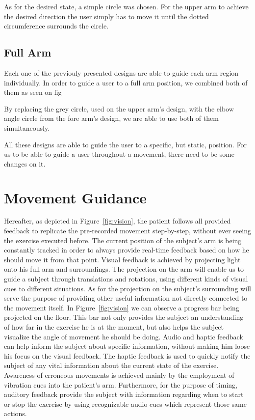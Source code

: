 
As for the desired state, a simple circle was chosen. For the upper arm to achieve the desired direction the user simply has to move it until the dotted circumference surrounds the circle.

\subsection{Full Arm}

Each one of the previouly presented designs are able to guide each arm region individually.
In order to guide a user to a full arm position, we combined both of them as seen on fig 

By replacing the grey circle, used on the upper arm's design, with the elbow angle circle from the fore arm's design, we are able to use both of them simultaneously. 

All these designs are able to guide the user to a specific, but static, position. For us to be able to guide a user throughout a movement, there need to be some changes on it.

\section{Movement Guidance}

Hereafter, as depicted in Figure~\ref{fig:vision}, 
the patient follows all provided feedback to replicate the pre-recorded movement step-by-step, without ever seeing the exercise executed before.
The current position of the subject's arm is being constantly tracked in order to always provide real-time 
feedback based on how he should move it from that point.
Visual feedback is achieved by projecting light onto his full arm and surroundings. The projection on the arm will enable us to 
guide a subject through translations and rotations, using different kinds of visual cues to different situations. As for the projection on the subject's surrounding 
will serve the purpose of providing other useful information not directly connected to the movement itself. 
In Figure~\ref{fig:vision} we can observe a progress bar being projected on the floor. 
This bar not only provides the subject an understanding of how far in the exercise he is at the moment, but also helps the subject visualize the angle of movement he should be doing.
Audio and haptic feedback can help inform the subject about specific information, without making him loose his focus on the visual feedback.
The haptic feedback is used to quickly notify the subject of any vital information about the current state of the exercise. 
Awareness of erroneous movements is achieved mainly by the employment of vibration cues into the patient's arm.
Furthermore, for the purpose of timing, auditory feedback provide the subject with information regarding when to start or stop the exercise by using recognizable audio cues which represent those same actions.

